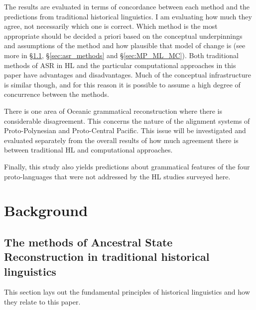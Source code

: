 \documentclass[12pt,letterpaper]{article}
\begin{document}
The results are evaluated in terms of concordance between each method and the predictions from traditional historical linguistics. I am evaluating how much they agree, not necessarily which one is correct. Which method is the most appropriate should be decided a priori based on the conceptual underpinnings and assumptions of the method and how plausible that model of change is (see more in §\ref{sec:ars:metod:hist}, §\ref{sec:asr_methods} and §\ref{sec:MP_ML_MC}). Both traditional methods of ASR in HL and the particular computational approaches in this paper have advantages and disadvantages. Much of the conceptual infrastructure is similar though, and for this reason it is possible to assume a high degree of concurrence between the methods. 

There is one area of Oceanic grammatical reconstruction where there is considerable disagreement. This concerns the nature of the alignment systems of Proto-Polynesian and Proto-Central Pacific. This issue will be investigated and evaluated separately from the overall results of how much agreement there is between traditional HL and computational approaches.

Finally, this study also yields predictions about grammatical features of the four proto-languages that were not addressed by the HL studies surveyed here.


\FloatBarrier
\section{Background}
\label{recon_grammar}

\subsection{The methods of Ancestral State Reconstruction in traditional historical linguistics}
\label{sec:ars:metod:hist}
This section lays out the fundamental principles of historical linguistics and how they relate to this paper.
\end{document}
